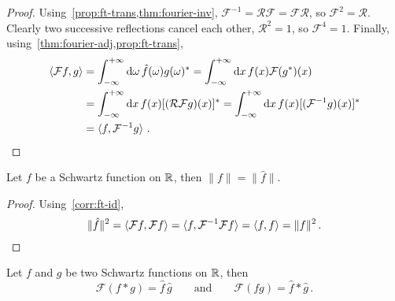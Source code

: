 \begin{proof}
  Using~\cref{prop:ft-trans,thm:fourier-inv},
  $\mathcal{F}^{-1}=\mathcal{R}\mathcal{F}=\mathcal{F}\mathcal{R}$, so
  $\mathcal{F}^2=\mathcal{R}$. Clearly two successive reflections cancel each other, \ie
  $\mathcal{R}^2=1$, so $\mathcal{F}^4=1$. Finally,
  using~\cref{thm:fourier-adj,prop:ft-trans},
  \begin{align}
    \braket{\mathcal{F}f,g}&=\int_{-\infty}^{+\infty}\mathrm{d}{\omega}\,\hat{f}(\omega)g(\omega)^*
    =\int_{-\infty}^{+\infty}\mathrm{d}{x}\,f(x)\mathcal{F}(g^*)(x)\\
    &=\int_{-\infty}^{+\infty}\mathrm{d}{x}\,f(x)[(\mathcal{R}\mathcal{F}g)(x)]^*
    =\int_{-\infty}^{+\infty}\mathrm{d}{x}\,f(x)[(\mathcal{F}^{-1}g)(x)]^*\\
    &=\braket{f,\mathcal{F}^{-1}g}\,.
  \end{align}
\end{proof}
\begin{theorem}[Plancherel]
  Let $f$ be a Schwartz function on $\mathbb{R}$, then $\|f\|=\|\hat{f}\|$.
\end{theorem}
\begin{proof}
  Using~\cref{corr:ft-id},
  \begin{equation}
    \|\hat{f}\|^2=\braket{\mathcal{F}f,\mathcal{F}f}
    =\braket{f,\mathcal{F}^{-1}\mathcal{F}f}
    =\braket{f,f}=\|f\|^2\,.
  \end{equation}
\end{proof}
\begin{theorem}
  Let $f$ and $g$ be two Schwartz functions on $\mathbb{R}$, then
  \begin{equation}
    \mathcal{F}(f\ast g)=\hat{f}\,\hat{g}\qquad\text{and}\qquad
    \mathcal{F}(fg)=\hat{f}\ast\hat{g}\,.
  \end{equation}
\end{theorem}
